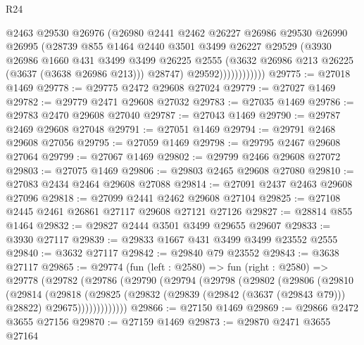 \begin{lexlean}{R24}
\begin{coremodule}
                        @2463
                        @29530
                        @26976
                        (@26980
                          @2441
                          @2462
                          @26227
                          @26986
                          @29530
                          @26990
                          @26995
                          (@28739
                            @855
                            @1464
                            @2440
                            @3501
                            @3499
                            @26227
                            @29529
                            (@3930
                              @26986
                              @1660
                              @431
                              @3499
                              @3499
                              @26225
                              @2555
                              (@3632 @26986 @213 @26225 (@3637 (@3638 @26986 @213)))
                              @28747)
                            @29592))))))))))))
@29775 := @27018 @1469
@29778 := @29775 @2472 @29608 @27024
@29779 := @27027 @1469
@29782 := @29779 @2471 @29608 @27032
@29783 := @27035 @1469
@29786 := @29783 @2470 @29608 @27040
@29787 := @27043 @1469
@29790 := @29787 @2469 @29608 @27048
@29791 := @27051 @1469
@29794 := @29791 @2468 @29608 @27056
@29795 := @27059 @1469
@29798 := @29795 @2467 @29608 @27064
@29799 := @27067 @1469
@29802 := @29799 @2466 @29608 @27072
@29803 := @27075 @1469
@29806 := @29803 @2465 @29608 @27080
@29810 := @27083 @2434 @2464 @29608 @27088
@29814 := @27091 @2437 @2463 @29608 @27096
@29818 := @27099 @2441 @2462 @29608 @27104
@29825 := @27108 @2445 @2461 @26861 @27117 @29608 @27121 @27126
@29827 := @28814 @855 @1464
@29832 := @29827 @2444 @3501 @3499 @29655 @29607
@29833 := @3930 @27117
@29839 := @29833 @1667 @431 @3499 @3499 @23552 @2555
@29840 := @3632 @27117
@29842 := @29840 @79 @23552
@29843 := @3638 @27117
@29865 := @29774
    (fun (left : @2580) =>
    fun (right : @2580) =>
    @29778
      (@29782
        (@29786
          (@29790
            (@29794
              (@29798
                (@29802
                  (@29806
                    (@29810
                      (@29814
                        (@29818
                          (@29825
                            (@29832
                              (@29839 (@29842 (@3637 (@29843 @79))) @28822)
                              @29675)))))))))))))
@29866 := @27150 @1469
@29869 := @29866 @2472 @3655 @27156
@29870 := @27159 @1469
@29873 := @29870 @2471 @3655 @27164

\end{coremodule}
\end{lexlean}
